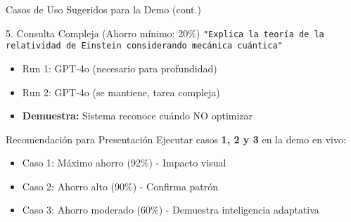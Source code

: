 \documentclass[aspectratio=169,11pt]{beamer}
\begin{document}
\begin{frame}{Casos de Uso Sugeridos para la Demo (cont.)}
\begin{block}{5. Consulta Compleja (Ahorro mínimo: 20\%)}
\texttt{"Explica la teoría de la relatividad de Einstein considerando mecánica cuántica"}
\begin{itemize}
    \item \textcolor{kavakred}{Run 1:} GPT-4o (necesario para profundidad)
    \item \textcolor{kavakred}{Run 2:} GPT-4o (se mantiene, tarea compleja)
    \item \textbf{Demuestra:} Sistema reconoce cuándo NO optimizar
\end{itemize}
\end{block}

\vspace{0.5cm}

\begin{alertblock}{Recomendación para Presentación}
Ejecutar casos \textbf{1, 2 y 3} en la demo en vivo:
\begin{itemize}
    \item Caso 1: Máximo ahorro (92\%) - Impacto visual
    \item Caso 2: Ahorro alto (90\%) - Confirma patrón
    \item Caso 3: Ahorro moderado (60\%) - Demuestra inteligencia adaptativa
\end{itemize}
\end{alertblock}
\end{frame}
\end{document}
